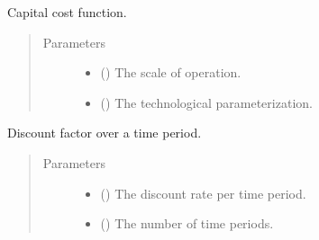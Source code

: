 \documentclass[letterpaper,10pt,english]{sphinxmanual}
\begin{document}
\begin{fulllineitems}
\label{\detokenize{technology:technology.pv_residential_large.capital_cost}}
Capital cost function.
\begin{quote}\begin{description}
\item[{Parameters}] \leavevmode\begin{itemize}
\item {} 
 () \textendash{} The scale of operation.

\item {} 
 () \textendash{} The technological parameterization.

\end{itemize}

\end{description}\end{quote}

\end{fulllineitems}


\begin{fulllineitems}
\label{\detokenize{technology:technology.pv_residential_large.discount}}
Discount factor over a time period.
\begin{quote}\begin{description}
\item[{Parameters}] \leavevmode\begin{itemize}
\item {} 
 () \textendash{} The discount rate per time period.

\item {} 
 () \textendash{} The number of time periods.

\end{itemize}

\end{description}\end{quote}

\end{fulllineitems}
\end{document}
